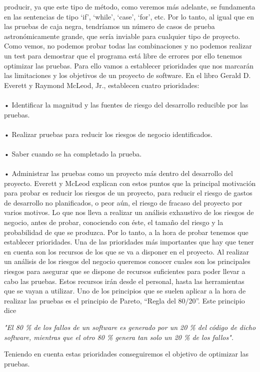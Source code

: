 \documentclass[12pt,letterpaper]{article}
\begin{document}
producir, ya que este tipo de método, como veremos más adelante, se fundamenta en las sentencias de tipo ‘if’, ‘while’, ‘case’, ‘for’, etc. Por lo tanto, al igual que en las pruebas de caja negra, tendríamos un número de casos de prueba astronómicamente grande, que sería inviable para cualquier tipo de proyecto.
Como vemos, no podemos probar todas las combinaciones y no podemos realizar un test para demostrar que el programa está libre de errores por ello tenemos optimizar las pruebas. Para ello vamos a establecer prioridades que nos marcarán las limitaciones y los objetivos de un proyecto de software.
En el libro Gerald D. Everett y Raymond McLeod, Jr., establecen cuatro prioridades:
\\
\\
•	Identificar la magnitud y las fuentes de riesgo del desarrollo reducible por las pruebas.
\\
\\
•	Realizar pruebas para reducir los riesgos de negocio identificados.
\\
\\
•	Saber cuando se ha completado la prueba.
\\
\\
•	Administrar las pruebas como un proyecto más dentro del desarrollo del proyecto.
Everett y McLeod explican con estos puntos que la principal motivación para probar es reducir los riesgos de un proyecto, para reducir el riesgo de gastos de desarrollo no planificados, o peor aún, el riesgo de fracaso del proyecto por varios motivos. Lo que nos lleva a realizar un análisis exhaustivo de los riesgos de negocio, antes de probar, conociendo con éste, el tamaño del riesgo y la probabilidad de que se produzca.
Por lo tanto, a la hora de probar tenemos que establecer prioridades. Una de las prioridades más importantes que hay que tener en cuenta son los recursos de los que se va a disponer en el proyecto. Al realizar un análisis de los riesgos del negocio queremos conocer cuales son los principales riesgos para asegurar que se dispone de recursos suficientes para poder llevar a cabo las pruebas. Estos recursos irán desde el personal, hasta las herramientas que se vayan a utilizar.
Uno de los principios que se suelen aplicar a la hora de realizar las pruebas es el principio de Pareto, “Regla del 80/20”. Este principio dice 

\begin{center}
    \textit{"El 80 \% de los fallos de un software es generado por un 20 \% del código de dicho software, mientras que el otro 80 \% genera tan solo un 20 \% de los fallos".}
\end{center} 
Teniendo en cuenta estas prioridades conseguiremos el objetivo de optimizar las pruebas.
 
\end{document}
